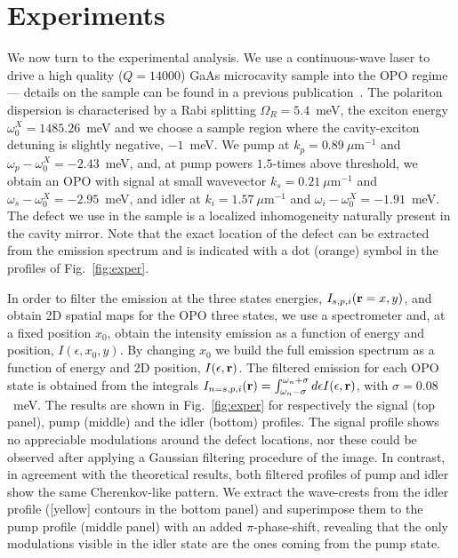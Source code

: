 \section{Experiments}
%
We now turn to the experimental analysis. We use a continuous-wave
laser to drive a high quality ($Q=14000$) GaAs microcavity sample into
the OPO regime --- details on the sample can be found in a previous
publication~\cite{Ballarini_2013,Dominici_2014}.
The polariton dispersion is characterised by a Rabi splitting
$\Omega_R=5.4$~meV, the exciton energy $\omega_0^{X}=1485.26$~meV and
we choose a sample region where the cavity-exciton detuning is
slightly negative, $-1$~meV. We pump at $k_p=0.89~\mu$m$^{-1}$ and
$\omega_p - \omega_0^{X}=-2.43$~meV, and, at pump powers $1.5$-times
above threshold, we obtain an OPO with signal at small wavevector
$k_s=0.21~\mu$m$^{-1}$ and $\omega_s - \omega_0^{X}=-2.95$~meV, and
idler at $k_i=1.57~\mu$m$^{-1}$ and $\omega_i -
\omega_0^{X}=-1.91$~meV.
%
The defect we use in the sample is a localized inhomogeneity naturally
present in the cavity mirror. Note that the exact location of the
defect can be extracted from the emission spectrum and is indicated
with a dot (orange) symbol in the profiles of Fig.~\ref{fig:exper}.

In order to filter the emission at the three states energies,
$I_{s,p,i}({\mathbf r}=x,y)$, and obtain 2D spatial maps for the OPO
three states, we use a spectrometer and, at a fixed position $x_0$,
obtain the intensity emission as a function of energy and position,
$I(\epsilon,x_0,y)$. By changing $x_0$ we build the full emission
spectrum as a function of energy and 2D position,
$I(\epsilon,{\mathbf r})$. The filtered emission for each OPO state is
obtained from the integrals $I_{n=s,p,i}({\mathbf r}) =
\int_{\omega_n-\sigma}^{\omega_n+\sigma} d\epsilon I(\epsilon,
{\mathbf r})$, with $\sigma=0.08$~meV. The results are shown in
Fig.~\ref{fig:exper} for respectively the signal (top panel), pump
(middle) and the idler (bottom) profiles.
%
The signal profile shows no appreciable modulations around the defect
locations, nor these could be observed after applying a Gaussian
filtering procedure of the image.
%
In contrast, in agreement with the theoretical results, both filtered
profiles of pump and idler show the same Cherenkov-like pattern. We
extract the wave-crests from the idler profile ([yellow] contours in
the bottom panel) and superimpose them to the pump profile (middle
panel) with an added $\pi$-phase-shift, revealing that the only
modulations visible in the idler state are the ones coming from the
pump state.


